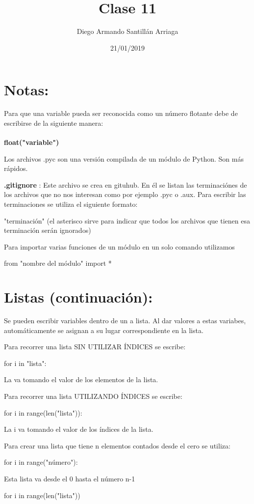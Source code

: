 \documentclass[letter paper, 12pt, oneside]{article}
\title{\Huge Clase 11}
\author{Diego Armando Santillán Arriaga}
\date{21/01/2019}
\begin{document}
	\maketitle	
\newpage
\section{Notas:}
Para que una variable pueda ser reconocida como un número flotante debe de escribirse de la siguiente manera:
\\\\
\textbf{float("variable")}

Los archivos .pyc son una versión compilada de un módulo de Python. Son más rápidos. 

\textbf{.gitignore} : Este archivo se crea en gituhub. En él se listan las terminaciónes de los archivos que no nos interesan como por ejemplo .pyc o .aux. Para escribir las terminaciones se utiliza el siguiente formato:

"terminación" (el asterisco sirve para indicar que todos los archivos que tienen esa terminación serán ignorados)

Para importar varias funciones de un módulo en un solo comando utilizamos

from "nombre del módulo" import * 


\section{Listas (continuación):}
Se pueden escribir variables dentro de un a lista. Al dar valores a estas variabes, automáticamente se asignan a su lugar correspondiente en la lista. 

Para recorrer una lista SIN UTILIZAR ÍNDICES se escribe:

for i in "lista":

La va tomando el valor de los elementos de la lista.

Para recorrer una lista UTILIZANDO ÍNDICES se escribe:

for i in range(len("lista")):

La i va tomando el valor de los índices de la lista.
 

Para crear una lista que tiene n elementos contados desde el cero se  utiliza:

for i in range("número"):

Esta lista va desde el 0 hasta el número n-1 


for i in  range(len("lista"))
\end{document}
